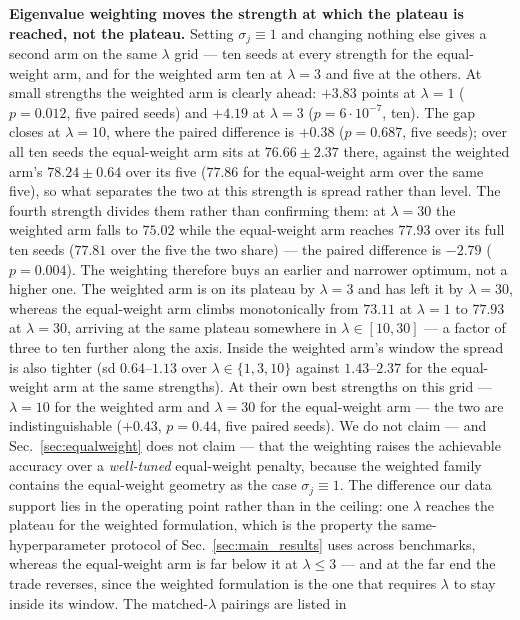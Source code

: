 \textbf{Eigenvalue weighting moves the strength at which the plateau is reached, not the
plateau.} Setting $\sigma_j\equiv1$ and changing nothing else gives a second arm on the
same $\lambda$ grid --- ten seeds at every strength for the equal-weight arm, and for the
weighted arm ten at $\lambda=3$ and five at the others. At small strengths the weighted
arm is clearly ahead: $+3.83$ points at $\lambda=1$ ($p=0.012$, five paired seeds) and
$+4.19$ at $\lambda=3$ ($p=6\cdot10^{-7}$, ten). The gap closes at $\lambda=10$, where the
paired difference is $+0.38$ ($p=0.687$, five seeds); over all ten seeds the equal-weight
arm sits at $76.66\pm2.37$ there, against the weighted arm's $78.24\pm0.64$ over its five
($77.86$ for the equal-weight arm over the same five), so what separates the two at this
strength is spread rather than level. The fourth strength
divides them rather than confirming them: at $\lambda=30$ the weighted arm falls to
$75.02$ while the equal-weight arm reaches $77.93$ over its full ten seeds ($77.81$ over the
five the two share) --- the paired difference is $-2.79$ ($p=0.004$). The weighting therefore buys an earlier and narrower optimum,
not a higher one. The weighted arm is on its plateau by $\lambda=3$ and has left it by
$\lambda=30$, whereas the equal-weight arm climbs monotonically from $73.11$ at
$\lambda=1$ to $77.93$ at $\lambda=30$, arriving at the same plateau somewhere in
$\lambda\in[10,30]$ --- a factor of three to ten further along the axis. Inside the
weighted arm's window the spread is also tighter (sd $0.64$--$1.13$ over
$\lambda\in\{1,3,10\}$ against $1.43$--$2.37$ for the equal-weight arm at the same
strengths). At their own best strengths on this grid --- $\lambda=10$ for the weighted arm
and $\lambda=30$ for the equal-weight arm --- the two are indistinguishable ($+0.43$,
$p=0.44$, five paired seeds). We do not claim --- and Sec.~\ref{sec:equalweight} does not
claim --- that the weighting raises the achievable accuracy over a \emph{well-tuned}
equal-weight penalty, because the weighted family contains the equal-weight geometry as
the case $\sigma_j\equiv1$. The difference our data support lies in the operating point
rather than in the ceiling: one $\lambda$ reaches the plateau for the weighted formulation,
which is the property the same-hyperparameter protocol of Sec.~\ref{sec:main_results} uses
across benchmarks, whereas the equal-weight arm is far below it at $\lambda\le3$ --- and at
the far end the trade reverses, since the weighted formulation is the one that requires
$\lambda$ to stay inside its window. The matched-$\lambda$ pairings are listed in
